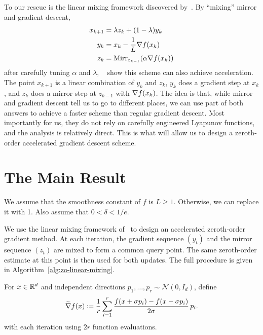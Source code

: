 To our rescue is the linear mixing framework discovered by~\citet{allenZhu2016linear}. By ``mixing'' mirror and gradient descent,
\begin{align*}
    x_{k+1} &= \lambda z_k + (1-\lambda) y_k\\
    y_{k} &= x_k - \frac{1}{L} \nabla f(x_k) \\
    z_k &= \mathrm{Mirr}_{z_{k-1}}(\alpha \nabla f(x_k))
\end{align*}
after carefully tuning $\alpha$ and $\lambda$, ~\citet{allenZhu2016linear} show this scheme can also achieve acceleration. The point $x_{k+1}$ is a linear combination of $y_k$ and $z_k$, $y_k$ does a gradient step at $x_k$, and $z_k$ does a mirror step at $z_{k-1}$ with $\nabla f(x_k)$. The idea is that, while mirror and gradient descent tell us to go to different places, we can use part of both answers to achieve a faster scheme than regular gradient descent. Most importantly for us, they do not rely on carefully engineered Lyapunov functions, and the analysis is relatively direct. This is what will allow us to design a zeroth-order accelerated gradient descent scheme.

\section{The Main Result}
\begin{assumption}
    We assume that the smoothness constant of $f$ is $L \geq 1$. Otherwise, we can replace it with 1. Also assume that $0 < \delta < 1/e$.
\end{assumption}

We use the linear mixing framework of~\citet{allenZhu2016linear} to design an accelerated zeroth-order gradient method. At each iteration, the gradient sequence $(y_t)$ and the mirror sequence $(z_t)$ are mixed to form a common query point. The same zeroth-order estimate at this point is then used for both updates. The full procedure is given in Algorithm~\ref{alg:zo-linear-mixing}.

\begin{definition}
    For $x\in\mathbb{R}^d$ and independent directions $p_1,\ldots,p_r\sim\mathcal N(0,I_d)$, define
    \begin{align*}
        \widetilde{\nabla} f(x)
        \coloneqq \frac1r\sum_{i=1}^r
        \frac{f(x+\sigma p_i)-f(x-\sigma p_i)}{2\sigma}\,p_i.
    \end{align*}
    with each iteration using $2r$ function evaluations.
\end{definition}

